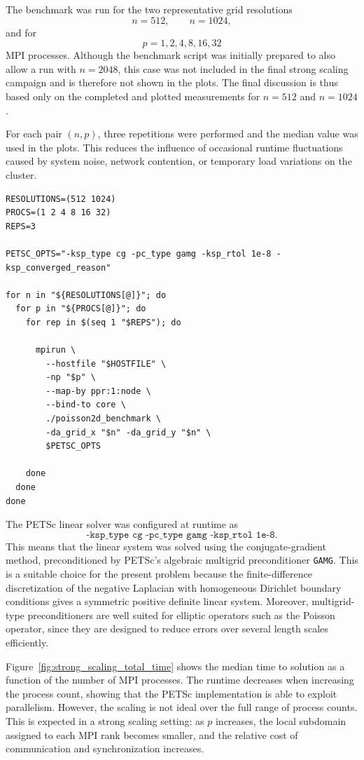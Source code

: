 \documentclass[unicode,10pt,a4paper,oneside,numbers=endperiod,openany]{scrartcl}
\begin{document}
The benchmark was run for the two representative grid resolutions
\[
    n = 512,
    \qquad
    n = 1024,
\]
and for
\[
    p = 1,2,4,8,16,32
\]
MPI processes. Although the benchmark script was initially prepared to also
allow a run with \(n=2048\), this case was not included in the final strong
scaling campaign and is therefore not shown in the plots. The final discussion
is thus based only on the completed and plotted measurements for
\(n=512\) and \(n=1024\).

For each pair \((n,p)\), three repetitions were performed and the median value
was used in the plots. This reduces the influence of occasional runtime
fluctuations caused by system noise, network contention, or temporary load
variations on the cluster.

\begin{lstlisting}[style=grayverbatim, caption={Representative benchmark loop for the strong scaling experiment}, label={lst:strong_scaling_loop}]
RESOLUTIONS=(512 1024)
PROCS=(1 2 4 8 16 32)
REPS=3

PETSC_OPTS="-ksp_type cg -pc_type gamg -ksp_rtol 1e-8 -ksp_converged_reason"

for n in "${RESOLUTIONS[@]}"; do
  for p in "${PROCS[@]}"; do
    for rep in $(seq 1 "$REPS"); do

      mpirun \
        --hostfile "$HOSTFILE" \
        -np "$p" \
        --map-by ppr:1:node \
        --bind-to core \
        ./poisson2d_benchmark \
        -da_grid_x "$n" -da_grid_y "$n" \
        $PETSC_OPTS

    done
  done
done
\end{lstlisting}

The PETSc linear solver was configured at runtime as
\[
    \texttt{-ksp\_type cg -pc\_type gamg -ksp\_rtol 1e-8}.
\]
This means that the linear system was solved using the conjugate-gradient
method, preconditioned by PETSc's algebraic multigrid preconditioner
\texttt{GAMG}. This is a suitable choice for the present problem because the
finite-difference discretization of the negative Laplacian with homogeneous
Dirichlet boundary conditions gives a symmetric positive definite linear
system. Moreover, multigrid-type preconditioners are well suited for elliptic
operators such as the Poisson operator, since they are designed to reduce errors
over several length scales efficiently.

Figure~\ref{fig:strong_scaling_total_time} shows the median time to solution as
a function of the number of MPI processes. The runtime decreases when increasing
the process count, showing that the PETSc implementation is able to exploit
parallelism. However, the scaling is not ideal over the full range of process
counts. This is expected in a strong scaling setting: as \(p\) increases, the
local subdomain assigned to each MPI rank becomes smaller, and the relative
cost of communication and synchronization increases.
\end{document}
